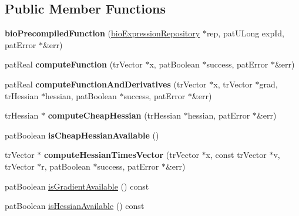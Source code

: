 \subsection*{Public Member Functions}
\begin{DoxyCompactItemize}
\item 
\mbox{\label{classbio_precompiled_function_a3605784fc26900073d58ba50d4323c2d}} 
{\bfseries bio\+Precompiled\+Function} (\hyperlink{classbio_expression_repository}{bio\+Expression\+Repository} $\ast$rep, pat\+U\+Long exp\+Id, pat\+Error $\ast$\&err)
\item 
\mbox{\label{classbio_precompiled_function_a7443f3ac1749a5acd78bb33fb1b053fb}} 
pat\+Real {\bfseries compute\+Function} (tr\+Vector $\ast$x, pat\+Boolean $\ast$success, pat\+Error $\ast$\&err)
\item 
\mbox{\label{classbio_precompiled_function_a3ac54f252b6fa8756f9e5504b6f178c2}} 
pat\+Real {\bfseries compute\+Function\+And\+Derivatives} (tr\+Vector $\ast$x, tr\+Vector $\ast$grad, tr\+Hessian $\ast$hessian, pat\+Boolean $\ast$success, pat\+Error $\ast$\&err)
\item 
\mbox{\label{classbio_precompiled_function_a73c7ac4e9ec854bbf9fe5f1db063c369}} 
tr\+Hessian $\ast$ {\bfseries compute\+Cheap\+Hessian} (tr\+Hessian $\ast$hessian, pat\+Error $\ast$\&err)
\item 
\mbox{\label{classbio_precompiled_function_a942cac73e3984be372f9b50bd2d6f52b}} 
pat\+Boolean {\bfseries is\+Cheap\+Hessian\+Available} ()
\item 
\mbox{\label{classbio_precompiled_function_a70b3ba8efb3a7af37bbad84bbd25bd0f}} 
tr\+Vector $\ast$ {\bfseries compute\+Hessian\+Times\+Vector} (tr\+Vector $\ast$x, const tr\+Vector $\ast$v, tr\+Vector $\ast$r, pat\+Boolean $\ast$success, pat\+Error $\ast$\&err)
\item 
pat\+Boolean \hyperlink{classbio_precompiled_function_a50c940f1d46f4ed75a4e54fbe425d11f}{is\+Gradient\+Available} () const
\item 
pat\+Boolean \hyperlink{classbio_precompiled_function_aaa821c6546652dd085391c4f2199c97a}{is\+Hessian\+Available} () const

\end{DoxyCompactItemize}
